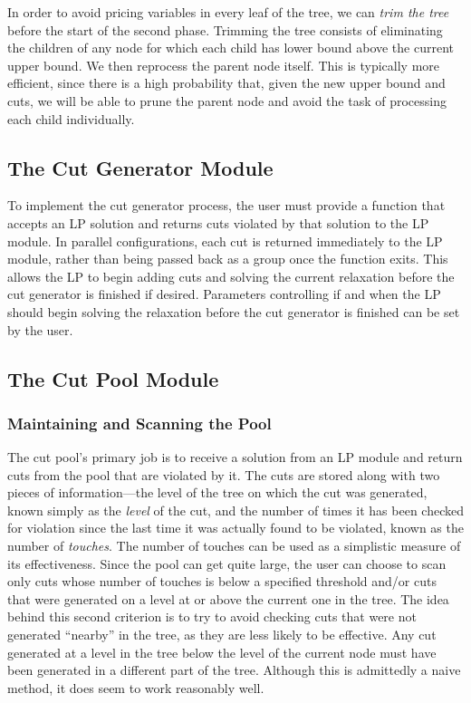 In order to avoid pricing variables in every leaf of the tree, we can
{\em trim the tree} before the start of the second phase. Trimming the
tree consists of eliminating the children of any node for which
each child has lower bound above the current upper
bound. We then reprocess the parent node itself. This is typically
more efficient, since there is a high probability that, given the new
upper bound and cuts, we will be able to prune the parent node and
avoid the task of processing each child individually.

\subsection{The Cut Generator Module}

To implement the cut generator process, the user must provide a
function that accepts an LP solution and returns cuts violated by that
solution to the LP module. In parallel configurations, each cut is
returned immediately to the LP module, rather than being passed back
as a group once the function exits. This allows the LP to begin adding
cuts and solving the current relaxation before the cut generator is
finished if desired. Parameters controlling if and when the LP should
begin solving the relaxation before the cut generator is finished can
be set by the user.

\subsection{The Cut Pool Module}

\subsubsection{Maintaining and Scanning the Pool}

The cut pool's primary job is to receive a solution from an
LP module and return cuts from the pool that are violated by it. The
cuts are stored along with two pieces of information---the level of
the tree on which the cut was generated, known simply as the {\em
level} of the cut, and the number of times it has been checked for
violation since the last time it was actually found to be violated,
known as the number of {\em touches}. The number of touches
can be used as a simplistic measure of its effectiveness. Since the pool
can get quite large, the user can choose to scan only cuts whose
number of touches is below a specified threshold and/or cuts that were
generated on a level at or above the current one in the tree. The idea
behind this second criterion is to try to avoid checking cuts that were
not generated ``nearby'' in the tree, as they are less likely to be
effective. Any cut generated at a level in the tree
below the level of the current node must have been generated in a
different part of the tree. Although this is admittedly a naive
method, it does seem to work reasonably well.

